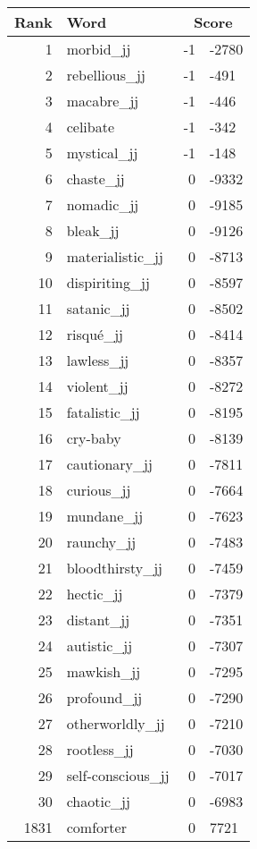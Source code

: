 \begin{longtable}[!htbp]{| rlr@{.}l |}
    \hline
    \textbf{Rank} & \textbf{Word} & \multicolumn{2}{c|}{\textbf{Score}} \\
    \hline
    \endhead
    1 & morbid\_jj & -1 & -2780 \\
    2 & rebellious\_jj & -1 & -491 \\
    3 & macabre\_jj & -1 & -446 \\
    4 & celibate & -1 & -342 \\
    5 & mystical\_jj & -1 & -148 \\
    6 & chaste\_jj & 0 & -9332 \\
    7 & nomadic\_jj & 0 & -9185 \\
    8 & bleak\_jj & 0 & -9126 \\
    9 & materialistic\_jj & 0 & -8713 \\
    10 & dispiriting\_jj & 0 & -8597 \\
    11 & satanic\_jj & 0 & -8502 \\
    12 & risqué\_jj & 0 & -8414 \\
    13 & lawless\_jj & 0 & -8357 \\
    14 & violent\_jj & 0 & -8272 \\
    15 & fatalistic\_jj & 0 & -8195 \\
    16 & cry-baby & 0 & -8139 \\
    17 & cautionary\_jj & 0 & -7811 \\
    18 & curious\_jj & 0 & -7664 \\
    19 & mundane\_jj & 0 & -7623 \\
    20 & raunchy\_jj & 0 & -7483 \\
    21 & bloodthirsty\_jj & 0 & -7459 \\
    22 & hectic\_jj & 0 & -7379 \\
    23 & distant\_jj & 0 & -7351 \\
    24 & autistic\_jj & 0 & -7307 \\
    25 & mawkish\_jj & 0 & -7295 \\
    26 & profound\_jj & 0 & -7290 \\
    27 & otherworldly\_jj & 0 & -7210 \\
    28 & rootless\_jj & 0 & -7030 \\
    29 & self-conscious\_jj & 0 & -7017 \\
    30 & chaotic\_jj & 0 & -6983 \\
    1831 & comforter & 0 & 7721 \\

\end{longtable}
